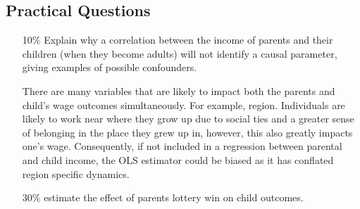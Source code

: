 \documentclass[../Main.tex]{subfiles}
\begin{document}
\begin{refsection}

\section{Practical Questions}

\begin{itemize}

    \item[10\%] Explain why a correlation between the income of parents and their
    children (when they become adults) will not identify a causal parameter, giving
    examples of possible confounders.
    
    \begin{answer}
        There are many variables that are likely to impact both the parents and
        child's wage outcomes simultaneously. For example, region. Individuals
        are likely to work near where they grow up due to social ties and a greater
        sense of belonging in the place they grew up in, however, this also greatly
        impacts one's wage. Consequently, if not included in a regression between
        parental and child income, the OLS estimator could be biased as it has conflated
        region specific dynamics.
    \end{answer}
    
    \item [30\%] \textcite{bleakley_shocking_2016} estimate the effect of parents lottery
    win on child outcomes.
    

\end{itemize}
\end{refsection}
\end{document}
